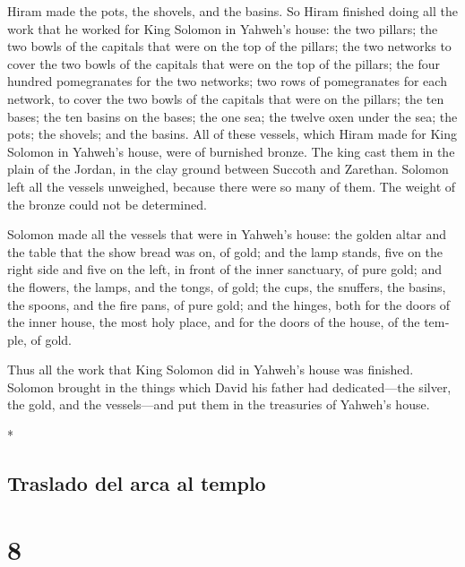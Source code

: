 \begin{paracol}{2}
\begin{otherlanguage}{english}
 Hiram made the pots, the shovels, and the basins. So
Hiram finished doing all the work that he worked for King Solomon in
Yahweh's house:  the two pillars; the two bowls of the
capitals that were on the top of the pillars; the two networks to cover
the two bowls of the capitals that were on the top of the pillars;
 the four hundred pomegranates for the two networks; two
rows of pomegranates for each network, to cover the two bowls of the
capitals that were on the pillars;  the ten bases; the
ten basins on the bases;  the one sea; the twelve oxen
under the sea;  the pots; the shovels; and the basins.
All of these vessels, which Hiram made for King Solomon in Yahweh's
house, were of burnished bronze.  The king cast them in
the plain of the Jordan, in the clay ground between Succoth and
Zarethan.  Solomon left all the vessels unweighed,
because there were so many of them. The weight of the bronze could not
be determined.

 Solomon made all the vessels that were in Yahweh's
house: the golden altar and the table that the show bread was on, of
gold;  and the lamp stands, five on the right side and
five on the left, in front of the inner sanctuary, of pure gold; and the
flowers, the lamps, and the tongs, of gold;  the cups,
the snuffers, the basins, the spoons, and the fire pans, of pure gold;
and the hinges, both for the doors of the inner house, the most holy
place, and for the doors of the house, of the temple, of gold.

 Thus all the work that King Solomon did in Yahweh's
house was finished. Solomon brought in the things which David his father
had dedicated---the silver, the gold, and the vessels---and put them in
the treasuries of Yahweh's house.

\end{otherlanguage}

\switchcolumn[0]*

\hypertarget{traslado-del-arca-al-templo}{%
\subsection{Traslado del arca al
templo}\label{traslado-del-arca-al-templo}}

\hypertarget{section-14}{%
\section{8}\label{section-14}}


\end{paracol}
